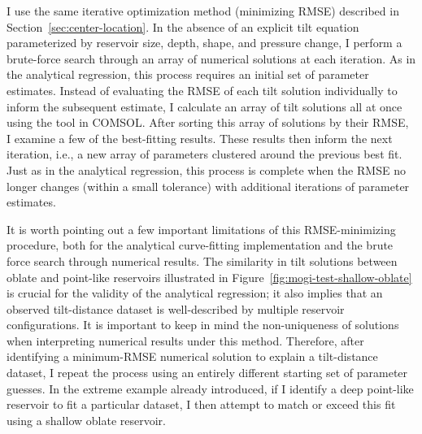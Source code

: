 I use the same iterative optimization method (minimizing \acs{RMSE}) described in Section~\ref{sec:center-location}. In the absence of an explicit tilt equation parameterized by reservoir size, depth, shape, and pressure change, I perform a brute-force search through an array of numerical solutions at each iteration. As in the analytical regression, this process requires an initial set of parameter estimates. Instead of evaluating the \acs{RMSE} of each tilt solution individually to inform the subsequent estimate, I calculate an array of tilt solutions all at once using the  tool in COMSOL. After sorting this array of solutions by their \acs{RMSE}, I examine a few of the best-fitting results. These results then inform the next iteration, i.e., a new array of parameters clustered around the previous best fit. Just as in the analytical regression, this process is complete when the \acs{RMSE} no longer changes (within a small tolerance) with additional iterations of parameter estimates.

It is worth pointing out a few important limitations of this \acs{RMSE}-minimizing procedure, both for the analytical curve-fitting implementation and the brute force search through numerical results. The similarity in tilt solutions between oblate and point-like reservoirs illustrated in Figure~\ref{fig:mogi-test-shallow-oblate} is crucial for the validity of the analytical regression; it also implies that an observed tilt-distance dataset is well-described by multiple reservoir configurations. It is important to keep in mind the non-uniqueness of solutions when interpreting numerical results under this method. Therefore, after identifying a minimum-\acs{RMSE} numerical solution to explain a tilt-distance dataset, I repeat the process using an entirely different starting set of parameter guesses. In the extreme example already introduced, if I identify a deep point-like reservoir to fit a particular dataset, I then attempt to match or exceed this fit using a shallow oblate reservoir.